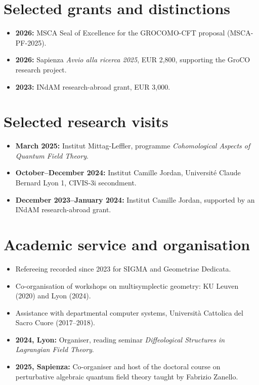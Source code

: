 \documentclass[11pt,a4paper]{article}
\begin{document}
\section*{Selected grants and distinctions}
\begin{itemize}
\item \textbf{2026:} MSCA Seal of Excellence for the GROCOMO-CFT proposal (MSCA-PF-2025).
\item \textbf{2026:} Sapienza \emph{Avvio alla ricerca 2025}, EUR 2,800, supporting the GroCO research project.
\item \textbf{2023:} INdAM research-abroad grant, EUR 3,000.
\end{itemize}
\newpage
\section*{Selected research visits}
\begin{itemize}
\item \textbf{March 2025:} Institut Mittag-Leffler, programme \emph{Cohomological Aspects of Quantum Field Theory}.
\item \textbf{October--December 2024:} Institut Camille Jordan, Universit\'e Claude Bernard Lyon 1, CIVIS-3i secondment.
\item \textbf{December 2023--January 2024:} Institut Camille Jordan, supported by an INdAM research-abroad grant.
\end{itemize}
\section*{Academic service and organisation}
\begin{itemize}
\item Refereeing recorded since 2023 for SIGMA and Geometriae Dedicata.
\item Co-organisation of workshops on multisymplectic geometry: KU Leuven (2020) and Lyon (2024).
\item Assistance with departmental computer systems, Universit\`a Cattolica del Sacro Cuore (2017--2018).
\item \textbf{2024, Lyon:} Organiser, reading seminar \emph{Diffeological Structures in Lagrangian Field Theory}.
\item \textbf{2025, Sapienza:} Co-organiser and host of the doctoral course on perturbative algebraic quantum field theory taught by Fabrizio Zanello.
\end{itemize}
\end{document}
